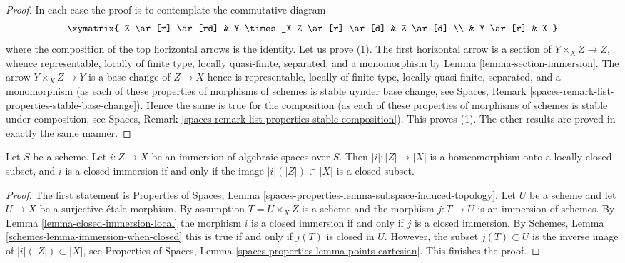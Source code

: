 \begin{proof}
In each case the proof is to contemplate the commutative diagram
$$
\xymatrix{
Z \ar[r] \ar[rd] & Y \times_X Z \ar[r] \ar[d] & Z \ar[d] \\
& Y \ar[r] & X
}
$$
where the composition of the top horizontal arrows is the identity.
Let us prove (1). The first horizontal arrow is a section of
$Y \times_X Z \to Z$, whence representable, locally of finite type,
locally quasi-finite, separated, and a monomorphism by
Lemma \ref{lemma-section-immersion}.
The arrow $Y \times_X Z \to Y$ is a base change of $Z \to X$
hence is representable, locally of finite type,
locally quasi-finite, separated, and a monomorphism
(as each of these properties of morphisms of schemes is stable
uynder base change, see
Spaces, Remark \ref{spaces-remark-list-properties-stable-base-change}).
Hence the same is true for the composition (as each of these properties of
morphisms of schemes is stable under composition, see Spaces, Remark
\ref{spaces-remark-list-properties-stable-composition}).
This proves (1). The other results are proved in exactly the same manner.
\end{proof}

\begin{lemma}
\label{lemma-immersion-when-closed}
Let $S$ be a scheme. Let $i : Z \to X$ be an immersion of algebraic
spaces over $S$. Then $|i| : |Z| \to |X|$ is a homeomorphism onto a
locally closed subset, and $i$ is a closed immersion if and only if
the image $|i|(|Z|) \subset |X|$ is a closed subset.
\end{lemma}

\begin{proof}
The first statement is Properties of Spaces, Lemma
\ref{spaces-properties-lemma-subspace-induced-topology}.
Let $U$ be a scheme and let $U \to X$ be a surjective \'etale morphism.
By assumption $T = U \times_X Z$ is a scheme and the morphism $j : T \to U$
is an immersion of schemes. By Lemma \ref{lemma-closed-immersion-local}
the morphism $i$ is a closed immersion if and only if $j$ is a closed
immersion. By Schemes, Lemma \ref{schemes-lemma-immersion-when-closed}
this is true if and only if $j(T)$ is closed in $U$.
However, the subset $j(T) \subset U$ is the inverse image of
$|i|(|Z|) \subset |X|$, see
Properties of Spaces, Lemma \ref{spaces-properties-lemma-points-cartesian}.
This finishes the proof.
\end{proof}

